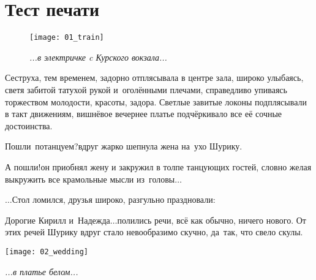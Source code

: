 \chapter{Тест печати}





\begin{figure}[h]
	\centering
	\texttt{[image: 01\_train]}
	\caption{\small\textit{...в электричке c Курского вокзала...}}	
\end{figure}


\newpage

Сеструха, тем временем, задорно отплясывала в центре зала, широко улыбаясь, светя забитой татухой рукой и~оголёнными плечами, справедливо упиваясь торжеством молодости, красоты, задора. Светлые завитые локоны подплясывали в такт движениям, вишнёвое вечернее платье подчёркивало все её сочные достоинства.

\noindent
\begin{minipage}{0.48\textwidth}
	\setlength{\parindent}{1.0cm}  %
	
	\indent \diagdash Пошли~потанцуем?\mdash вдруг жарко шепнула жена на~ухо Шурику.
	
	\indent \diagdash А пошли!\mdash он приобнял жену и закружил в толпе танцующих гостей, словно желая выкружить все крамольные мысли из~головы$\ldots$
	
	\indent $\ldots$Стол ломился, друзья широко, разгульно праздновали:
	
	\indent \diagdash Дорогие Кирилл и~Надежда$\ldots$\mdash полились речи, всё как обычно, ничего нового. От этих речей Шурику вдруг стало невообразимо скучно, да~так, что свело скулы.
\end{minipage}\hfill
\begin{minipage}{0.5\textwidth}
	\centering
	\texttt{[image: 02\_wedding]}
	
	{\small\textit{...в платье белом...}}
\end{minipage}

\newpage

